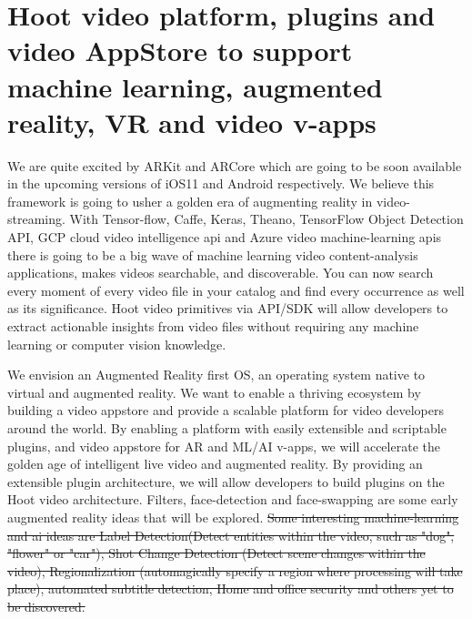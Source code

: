 \documentclass{article}
\begin{document}


\section{Hoot video platform, plugins and video AppStore to support machine learning, augmented reality, VR and video v-apps}
We are quite excited by ARKit and ARCore which are going to be soon available in the upcoming versions of iOS11 and Android respectively. We believe this framework is going to usher a golden era of augmenting reality in video-streaming. With Tensor-flow, Caffe, Keras, Theano, TensorFlow Object Detection API, GCP cloud video intelligence api and Azure video machine-learning apis there is going to be a big wave of machine learning video content-analysis applications, makes videos searchable, and discoverable. You can now search every moment of every video file in your catalog and find every occurrence as well as its significance. Hoot video primitives via API/SDK will allow developers to extract actionable insights from video files without requiring any machine learning or computer vision knowledge. 

We envision an Augmented Reality first OS, an operating system native to virtual and augmented reality. We want to enable a thriving ecosystem by building a video appstore and provide a scalable platform for video developers around the world. By enabling a platform with easily extensible and scriptable plugins, and video appstore for AR and ML/AI v-apps, we will accelerate the golden age of intelligent live video and augmented reality. By providing an extensible plugin architecture, we will allow developers to build plugins on the Hoot video architecture. Filters, face-detection and face-swapping are some early augmented reality ideas that will be explored. 
\sout{Some interesting machine-learning and ai ideas are Label Detection(Detect entities within the video, such as "dog", "flower" or "car"), Shot Change Detection (Detect scene changes within the video), Regionalization (automagically specify a region where processing will take place), automated subtitle detection, Home and office security and others yet to be discovered.} 
\end{document}
